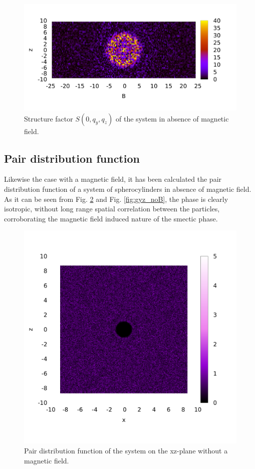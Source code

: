 \documentclass[aip,graphicx]{revtex4-1}
\begin{document}
\begin{figure}
    \centering
    \includegraphics[width=0.7\columnwidth]{Syz_noB.png}
    \caption{Structure factor $S(0, q_y, q_z)$ of the system in absence of magnetic field.}
    \label{fig:Syz_noB}
\end{figure}


\subsection{Pair distribution function}

Likewise the case with a magnetic field, it has been calculated the pair distribution function of a system of spherocylinders in absence of magnetic field. As it can be seen from Fig. \ref{fig:gxz_noB} and Fig. \ref{fig:gyz_noB}, the phase is clearly isotropic, without long range spatial correlation between the particles, corroborating the magnetic field induced nature of the smectic phase.


\begin{figure}
    \centering
    \includegraphics[width=0.7\columnwidth]{gxz_noB.png}
    \caption{Pair distribution function of the system on the xz-plane without a magnetic field.}
    \label{fig:gxz_noB}
\end{figure}
\end{document}
